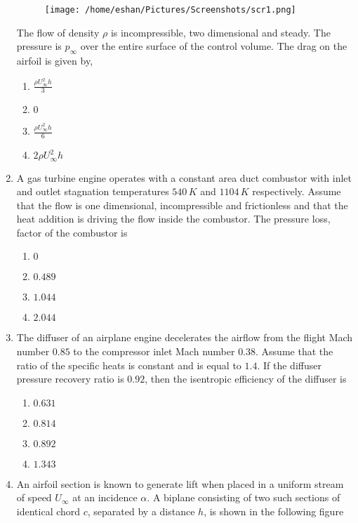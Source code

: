 \documentclass[journal]{IEEEtran}
\begin{document}
\begin{enumerate}
  \begin{figure}[h]
    \centering
    \texttt{[image: /home/eshan/Pictures/Screenshots/scr1.png]} 
    \caption{}
    \label{}
\end{figure}
The flow of density $\rho$ is incompressible, two dimensional and steady. The pressure is $p_\infty$ over the entire surface of the control volume. The drag on the airfoil is given by,
        \begin{enumerate}
            \item $\frac{\rho U_\infty^2h}{3}$
            \item $0$
            \item $\frac{\rho U_\infty^2h}{6}$
            \item $2\rho U_\infty^2h$
        \end{enumerate}
    \item A gas turbine engine operates with a constant area duct combustor with inlet and outlet stagnation temperatures $540\, K$ and $1104\, K$ respectively. Assume that the flow is one dimensional, incompressible and frictionless and that the heat addition is driving the flow inside the combustor. The pressure loss, factor  of the combustor is 
            \begin{enumerate}
                \item $0$
                \item $0.489$
                \item $1.044$
                \item $2.044$
            \end{enumerate}
    \item The diffuser of an airplane engine decelerates the airflow from the flight Mach number $0.85$ to the compressor inlet Mach number $0.38$. Assume that the ratio of the specific heats is constant and is equal to $1.4$. If the diffuser pressure recovery ratio is $0.92$, then the isentropic efficiency of the diffuser is
        \begin{enumerate}
            \item $0.631$
            \item $0.814$
            \item $0.892$
            \item $1.343$
        \end{enumerate}
    \item An airfoil section is known to generate lift when placed in a uniform stream of speed $U_\infty$ at an incidence $\alpha$. A biplane consisting of two such sections of identical chord $c$, separated by a distance $h$, is shown in the following figure


\end{enumerate}
\end{document}
